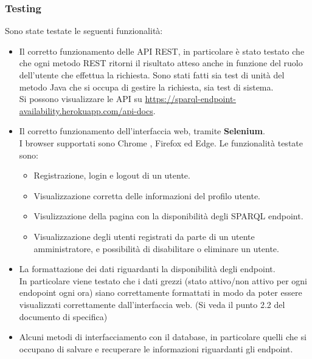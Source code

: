 \documentclass[8pt]{beamer}
\begin{document}
\begin{frame}[allowframebreaks]
    \frametitle{Testing}
    Sono state testate le seguenti funzionalità:
    \begin{itemize}
        \item Il corretto funzionamento delle API REST, in particolare è stato testato
              che che ogni metodo REST ritorni il risultato atteso anche in funzione del ruolo dell'utente che effettua la richiesta.
              Sono stati fatti sia test di unità del metodo Java che si occupa di gestire la richiesta, sia test di sistema.\\
              Si possono visualizzare le API su \url{https://sparql-endpoint-availability.herokuapp.com/api-docs}.
        \item Il corretto funzionamento dell'interfaccia web, tramite \textbf{Selenium}.\\
              I browser supportati sono Chrome , Firefox ed Edge.
              Le funzionalità testate sono:
              \begin{itemize}
                  \item Registrazione, login e logout di un utente.
                  \item Visualizzazione corretta delle informazioni del profilo utente.
                  \item Visulizzazione della pagina con la disponibilità degli SPARQL endpoint.
                  \item Visualizzazione degli utenti registrati da parte di un utente amministratore, e possibilità di disabilitare o eliminare un utente.
              \end{itemize}
        \item La formattazione dei dati riguardanti la disponibilità degli endpoint.   \\
              In particolare viene testato che i dati grezzi (stato attivo/non attivo per ogni endopoint ogni ora) siano correttamente formattati in modo da poter essere visualizzati correttamente dall'interfaccia web.
              (Si veda il punto 2.2 del documento di specifica)
        \item Alcuni metodi di interfacciamento con il database, in particolare quelli che si occupano di salvare e recuperare le informazioni riguardanti gli endpoint.
    \end{itemize}
\end{frame}
\end{document}
